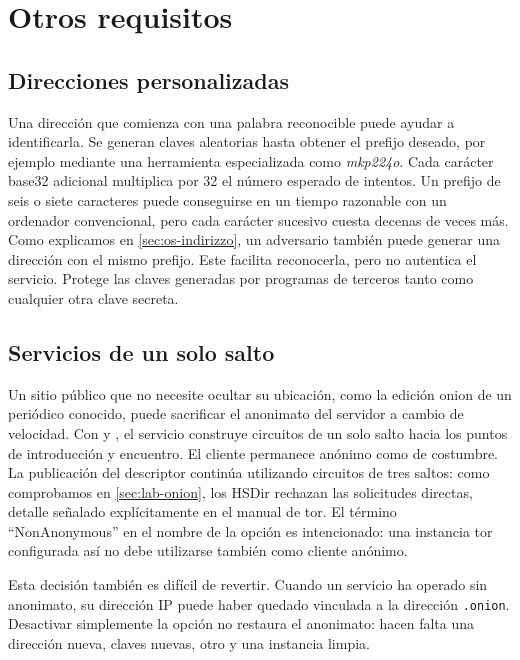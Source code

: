 \section{Otros requisitos}\label{sec:onionp-altre}

\subsection{Direcciones personalizadas}

Una dirección que comienza con una palabra reconocible puede ayudar a identificarla. Se generan claves aleatorias hasta obtener el prefijo deseado, por ejemplo mediante una herramienta especializada como \emph{mkp224o}. Cada carácter base32 adicional multiplica por 32 el número esperado de intentos. Un prefijo de seis o siete caracteres puede conseguirse en un tiempo razonable con un ordenador convencional, pero cada carácter sucesivo cuesta decenas de veces más. Como explicamos en \cref{sec:os-indirizzo}, un adversario también puede generar una dirección con el mismo prefijo. Este facilita reconocerla, pero no autentica el servicio. Protege las claves generadas por programas de terceros tanto como cualquier otra clave secreta.

\subsection{Servicios de un solo salto}

Un sitio público que no necesite ocultar su ubicación, como la edición onion de un periódico conocido, puede sacrificar el anonimato del servidor a cambio de velocidad. Con  y , el servicio construye circuitos de un solo salto hacia los puntos de introducción y encuentro. El cliente permanece anónimo como de costumbre. La publicación del descriptor continúa utilizando circuitos de tres saltos: como comprobamos en \cref{sec:lab-onion}, los HSDir rechazan las solicitudes directas, detalle señalado explícitamente en el manual de tor. El término \enquote{NonAnonymous} en el nombre de la opción es intencionado: una instancia tor configurada así no debe utilizarse también como cliente anónimo.

Esta decisión también es difícil de revertir. Cuando un servicio ha operado sin anonimato, su dirección IP puede haber quedado vinculada a la dirección \texttt{.onion}. Desactivar simplemente la opción no restaura el anonimato: hacen falta una dirección nueva, claves nuevas, otro  y una instancia limpia.

